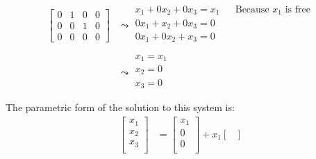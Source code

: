 \documentclass[10pt,letterpaper,final]{report}
\newcommand{\reason}[1]{&& \text{#1}}
\begin{document}
\begin{enumerate}[label=(\alph*)]
\begin{enumerate}[label=(\arabic*)]
\begin{align*}
                  \left[\begin{array}{rrr|r}
                      0 & 1 & 0 & 0 \\
                      0 & 0 & 1 & 0 \\
                      0 & 0 & 0 & 0
                    \end{array}\right] & \leadsto \begin{matrix}
                                                    x_1 + 0x_2 + 0x_3 = x_1 \reason{Because $x_1$ is free} \\
                                                    0x_1 + x_2 + 0x_3 = 0                                  \\
                                                    0x_1 + 0x_2 + x_3 = 0                                  \\
                                                  \end{matrix} \\[1ex]
                                             & \leadsto \begin{matrix}
                                                          x_1 = x_1 \\
                                                          x_2 = 0   \\
                                                          x_3 = 0   \\
                                                        \end{matrix}                                    \\[1ex]
                \end{align*}
                The parametric form of the solution to this system is:
                \begin{align*}
                  \begin{bmatrix}
                    x_1 \\
                    x_2 \\
                    x_3 \\
                  \end{bmatrix} & = \begin{bmatrix}
                                      x_1 \\
                                      0   \\
                                      0   \\
                                    \end{bmatrix} + x_1\begin{bmatrix}

\end{bmatrix}
\end{align*}
\end{enumerate}
\end{enumerate}
\end{document}
